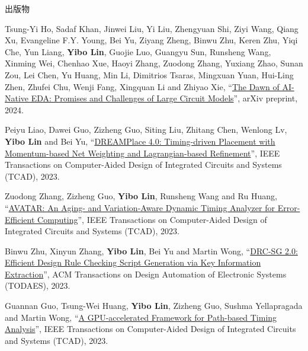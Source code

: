 \begin{rSection}{出版物}
\begin{description}[font=\normalfont, rightmargin=2em]
\item[{[J52]}]{
        Tsung-Yi Ho, Sadaf Khan, Jinwei Liu, Yi Liu, Zhengyuan Shi, Ziyi Wang, Qiang Xu, Evangeline F.Y. Young, Bei Yu, Ziyang Zheng, Binwu Zhu, Keren Zhu, Yiqi Che, Yun Liang, \textbf{Yibo Lin}, Guojie Luo, Guangyu Sun, Runsheng Wang, Xinming Wei, Chenhao Xue, Haoyi Zhang, Zuodong Zhang, Yuxiang Zhao, Sunan Zou, Lei Chen, Yu Huang, Min Li, Dimitrios Tsaras, Mingxuan Yuan, Hui-Ling Zhen, Zhufei Chu, Wenji Fang, Xingquan Li and Zhiyao Xie, 
    ``\href{https://arxiv.org/pdf/2403.07257.pdf}{The Dawn of AI-Native EDA: Promises and Challenges of Large Circuit Models}'', 
    arXiv preprint, 2024.
    
}
            

\item[{[J51]}]{
        Peiyu Liao, Dawei Guo, Zizheng Guo, Siting Liu, Zhitang Chen, Wenlong Lv, \textbf{Yibo Lin} and Bei Yu, 
    ``\href{https://doi.org/10.1109/TCAD.2023.3240132}{DREAMPlace 4.0: Timing-driven Placement with Momentum-based Net Weighting and Lagrangian-based Refinement}'', 
    IEEE Transactions on Computer-Aided Design of Integrated Circuits and Systems (TCAD), 2023.
    
}
            

\item[{[J50]}]{
        Zuodong Zhang, Zizheng Guo, \textbf{Yibo Lin}, Runsheng Wang and Ru Huang, 
    ``\href{https://doi.org/10.1109/TCAD.2023.3255167}{AVATAR: An Aging- and Variation-Aware Dynamic Timing Analyzer for Error-Efficient Computing}'', 
    IEEE Transactions on Computer-Aided Design of Integrated Circuits and Systems (TCAD), 2023.
    
}
            

\item[{[J49]}]{
        Binwu Zhu, Xinyun Zhang, \textbf{Yibo Lin}, Bei Yu and Martin Wong, 
    ``\href{https://doi.org/10.1145/3594666}{DRC-SG 2.0: Efficient Design Rule Checking Script Generation via Key Information Extraction}'', 
    ACM Transactions on Design Automation of Electronic Systems (TODAES), 2023.
    
}
            

\item[{[J48]}]{
        Guannan Guo, Tsung-Wei Huang, \textbf{Yibo Lin}, Zizheng Guo, Sushma Yellapragada and Martin Wong, 
    ``\href{https://doi.org/10.1109/TCAD.2023.3272274}{A GPU-accelerated Framework for Path-based Timing Analysis}'', 
    IEEE Transactions on Computer-Aided Design of Integrated Circuits and Systems (TCAD), 2023.
    
}
\end{description}
\end{rSection}
